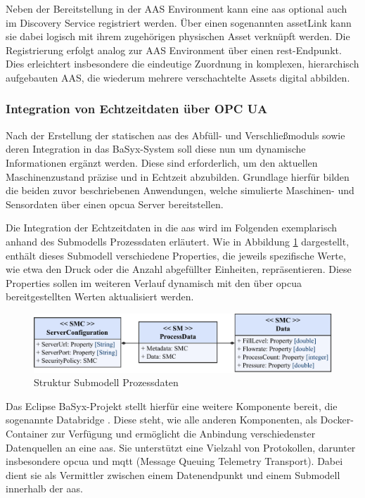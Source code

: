 

Neben der Bereitstellung in der AAS Environment kann eine \acs{aas} optional auch im Discovery Service registriert werden.
Über einen sogenannten assetLink kann sie dabei logisch mit ihrem zugehörigen physischen Asset verknüpft werden.
Die Registrierung erfolgt analog zur AAS Environment über einen \acs{rest}-Endpunkt.
Dies erleichtert insbesondere die eindeutige Zuordnung in komplexen, hierarchisch aufgebauten AAS, die wiederum mehrere verschachtelte Assets digital abbilden.

\subsubsection{Integration von Echtzeitdaten über OPC UA}

Nach der Erstellung der statischen \acs{aas} des Abfüll- und Verschließmoduls sowie deren Integration in das BaSyx-System soll diese nun um dynamische Informationen ergänzt werden.
Diese sind erforderlich, um den aktuellen Maschinenzustand präzise und in Echtzeit abzubilden.
Grundlage hierfür bilden die beiden zuvor beschriebenen Anwendungen, welche simulierte Maschinen- und Sensordaten über einen \acs{opcua} Server bereitstellen.

Die Integration der Echtzeitdaten in die \acs{aas} wird im Folgenden exemplarisch anhand des Submodells Prozessdaten erläutert.
Wie in Abbildung \ref{fig:SubmodellProzessdaten} dargestellt, enthält dieses Submodell verschiedene Properties, die jeweils spezifische Werte, wie etwa den Druck oder die Anzahl abgefüllter Einheiten, repräsentieren.
Diese Properties sollen im weiteren Verlauf dynamisch mit den über \acs{opcua} bereitgestellten Werten aktualisiert werden.

\begin{figure}[htbp]
    \centering
    \includegraphics[width=1\textwidth]{Bilder/OPCUA/ProcessData.pdf}
    \caption[Struktur Submodell Prozessdaten]{Struktur Submodell Prozessdaten}
    \label{fig:SubmodellProzessdaten}
\end{figure}
\vspace{-0.5em}

Das Eclipse BaSyx-Projekt stellt hierfür eine weitere Komponente bereit, die sogenannte Databridge \cite{BaSyxDatabridge}.
Diese steht, wie alle anderen Komponenten, als Docker-Container zur Verfügung und ermöglicht die Anbindung verschiedenster Datenquellen an eine \acs{aas}.
Sie unterstützt eine Vielzahl von Protokollen, darunter insbesondere \acs{opcua} und \acs{mqtt} (Message Queuing Telemetry Transport).
Dabei dient sie als Vermittler zwischen einem Datenendpunkt und einem Submodell innerhalb der \acs{aas}.

